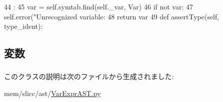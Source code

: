 \begin{DoxyCode}
44                  :
45         var = self.symtab.find(self._var, Var)
46         if not var:
47             self.error("Unrecognized variable: %
48         return var
49 
    def assertType(self, type_ident):
\end{DoxyCode}


\subsection{変数}
\hypertarget{classslicc_1_1ast_1_1VarExprAST_1_1VarExprAST_a4f6c7825f9d0a389be21c303ec4d09e8}{
\subsubsection[{\_\-var}]{}}
\label{classslicc_1_1ast_1_1VarExprAST_1_1VarExprAST_a4f6c7825f9d0a389be21c303ec4d09e8}


このクラスの説明は次のファイルから生成されました:\begin{DoxyCompactItemize}
\item 
mem/slicc/ast/\hyperlink{VarExprAST_8py}{VarExprAST.py}\end{DoxyCompactItemize}
